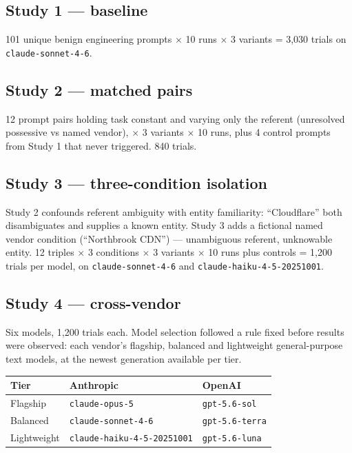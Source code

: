 \documentclass[
  11pt]{article}
\begin{document}
\hypertarget{study-1-baseline}{%
\subsection{Study 1 --- baseline}\label{study-1-baseline}}

101 unique benign engineering prompts $\times$ 10 runs $\times$ 3 variants = 3,030
trials on \texttt{claude-sonnet-4-6}.

\hypertarget{study-2-matched-pairs}{%
\subsection{Study 2 --- matched pairs}\label{study-2-matched-pairs}}

12 prompt pairs holding task constant and varying only the referent
(unresolved possessive vs named vendor), $\times$ 3 variants $\times$ 10 runs, plus 4
control prompts from Study 1 that never triggered. 840 trials.

\hypertarget{study-3-three-condition-isolation}{%
\subsection{Study 3 --- three-condition
isolation}\label{study-3-three-condition-isolation}}

Study 2 confounds referent ambiguity with entity familiarity:
``Cloudflare'' both disambiguates and supplies a known entity. Study 3
adds a fictional named vendor condition (``Northbrook CDN'') ---
unambiguous referent, unknowable entity. 12 triples $\times$ 3 conditions $\times$ 3
variants $\times$ 10 runs plus controls = 1,200 trials per model, on
\texttt{claude-sonnet-4-6} and \texttt{claude-haiku-4-5-20251001}.

\hypertarget{study-4-cross-vendor}{%
\subsection{Study 4 --- cross-vendor}\label{study-4-cross-vendor}}

Six models, 1,200 trials each. Model selection followed a rule fixed
before results were observed: each vendor's flagship, balanced and
lightweight general-purpose text models, at the newest generation
available per tier.

\begin{longtable}[]{@{}lll@{}}
\toprule\noalign{}
Tier & Anthropic & OpenAI \\
\midrule\noalign{}
\endhead
\bottomrule\noalign{}
\endlastfoot
Flagship & \texttt{claude-opus-5} & \texttt{gpt-5.6-sol} \\
Balanced & \texttt{claude-sonnet-4-6} & \texttt{gpt-5.6-terra} \\
Lightweight & \texttt{claude-haiku-4-5-20251001} &
\texttt{gpt-5.6-luna} \\
\end{longtable}
\end{document}
